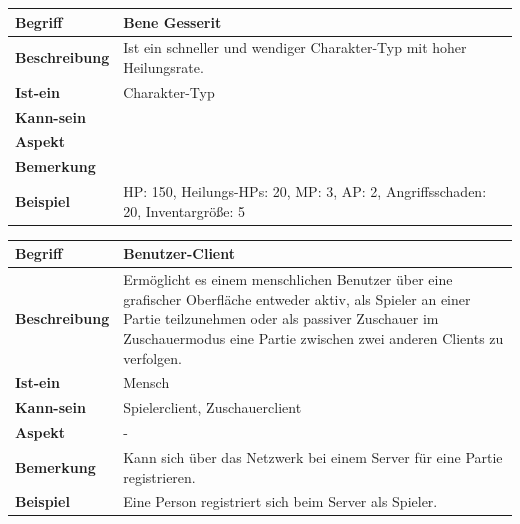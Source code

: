 \documentclass[12pt]{article}
\begin{document}
\begin{tabularx}{\linewidth}{|l|X|}
\hline
\textbf{Begriff} & \textbf{Bene Gesserit} \\
\hline
\textbf{Beschreibung} & Ist ein schneller und wendiger Charakter-Typ mit hoher Heilungsrate. \\
\hline
\textbf{Ist-ein} & Charakter-Typ\\
\hline
\textbf{Kann-sein} & \\
\hline
\textbf{Aspekt} & \\
\hline
\textbf{Bemerkung} &  \\
\hline
\textbf{Beispiel} & HP: 150, Heilungs-HPs: 20, MP: 3, AP: 2, Angriffsschaden: 20, Inventargröße: 5 \\
\hline
\end{tabularx}

\begin{tabularx}{\linewidth}{|l|X|}
\hline
\textbf{Begriff} & \textbf{Benutzer-Client} \\
\hline
\textbf{Beschreibung} & Ermöglicht es einem menschlichen Benutzer  über eine grafischer Oberfläche  entweder aktiv, als Spieler an einer Partie teilzunehmen oder als passiver Zuschauer im Zuschauermodus eine Partie zwischen zwei anderen Clients zu verfolgen. \\
\hline
\textbf{Ist-ein} & Mensch \\
\hline
\textbf{Kann-sein} & Spielerclient, Zuschauerclient \\
\hline
\textbf{Aspekt} & - \\
\hline
\textbf{Bemerkung} & Kann sich über das Netzwerk bei einem Server für eine Partie registrieren. \\
\hline
\textbf{Beispiel} & Eine Person registriert sich beim Server als Spieler. \\
\hline
\end{tabularx}
\end{document}
